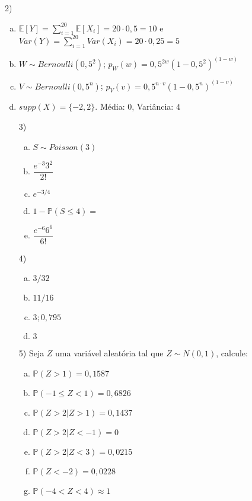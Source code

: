 \documentclass{article}
\begin{document}
2) 
\begin{enumerate}[a)]
    \item $\mathbb{E}[Y] = \sum_{i=1}^{20} \mathbb{E}[X_i] = 20 \cdot 0,5 = 10$ e $Var(Y) = \sum_{i=1}^{20} Var(X_i) = 20 \cdot 0,25 = 5$
    \item $W \sim Bernoulli(0,5^2)$; $p_W(w) = 0,5^{2w} (1-0,5^2)^(1-w)$ 
    \item $V \sim Bernoulli(0,5^n)$; $p_V(v) = 0,5^{n \cdot v} (1-0,5^n)^(1-v)$
    \item $supp(X) = \{-2, 2\}$. Média: $0$, Variância: $4$
\vspace{5px}

3) 

\begin{enumerate}[a)]
    \item $S \sim Poisson(3)$
    \item $\dfrac{e^{-3}3^2}{2!}$
    \item $e^{-3/4}$
    \item $1 - \mathds{P}(S\leq 4) = $
    \item $\dfrac{e^{-6}6^6}{6!}$
\end{enumerate}

\vspace{5px}

4) 

\begin{enumerate}[a)]
    \item $3/32$
    \item $11/16$
    \item $3; 0,795$
    \item $3$
\end{enumerate}

\vspace{5px}

5) Seja $Z$ uma variável aleatória tal que $Z\sim N(0,1)$, calcule:

\begin{enumerate}[a)]
    \item $\mathds{P}(Z>1) = 0,1587$
    \item $\mathds{P}(-1 \leq Z<1) = 0,6826$
    \item  $\mathds{P}(Z>2| Z> 1) = 0,1437$
    \item $\mathds{P}(Z>2| Z< -1) = 0$
    \item $\mathds{P}(Z>2| Z< 3) = 0,0215$
    \item $\mathds{P}(Z<-2) = 0,0228$
    \item $\mathds{P}(-4<Z<4) \approx 1$
\end{enumerate}


\end{enumerate}
\end{document}
